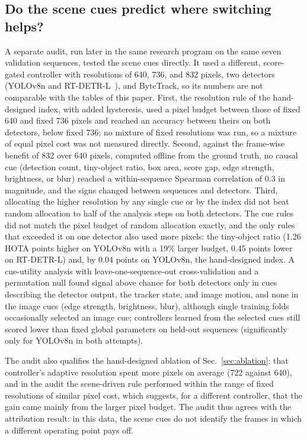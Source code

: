 \documentclass[journal]{new-aiaa}
\begin{document}
\subsection{Do the scene cues predict where switching helps?}
A separate audit, run later in the same research program on the same seven validation sequences, tested the scene cues directly. It used a different, score-gated controller with resolutions of 640, 736, and 832 pixels, two detectors (YOLOv8n and RT-DETR-L~\cite{zhao2024rtdetr}), and ByteTrack, so its numbers are not comparable with the tables of this paper. First, the resolution rule of the hand-designed index, with added hysteresis, used a pixel budget between those of fixed 640 and fixed 736 pixels and reached an accuracy between theirs on both detectors, below fixed 736; no mixture of fixed resolutions was run, so a mixture of equal pixel cost was not measured directly. Second, against the frame-wise benefit of 832 over 640 pixels, computed offline from the ground truth, no causal cue (detection count, tiny-object ratio, box area, score gap, edge strength, brightness, or blur) reached a within-sequence Spearman correlation of 0.3 in magnitude, and the signs changed between sequences and detectors. Third, allocating the higher resolution by any single cue or by the index did not beat random allocation to half of the analysis steps on both detectors. The cue rules did not match the pixel budget of random allocation exactly, and the only rules that exceeded it on one detector also used more pixels: the tiny-object ratio (1.26 HOTA points higher on YOLOv8n with a 19\% larger budget, 0.45 points lower on RT-DETR-L) and, by 0.04 points on YOLOv8n, the hand-designed index. A cue-utility analysis with leave-one-sequence-out cross-validation and a permutation null found signal above chance for both detectors only in cues describing the detector output, the tracker state, and image motion, and none in the image cues (edge strength, brightness, blur), although single training folds occasionally selected an image cue; controllers learned from the selected cues still scored lower than fixed global parameters on held-out sequences (significantly only for YOLOv8n in both attempts).

The audit also qualifies the hand-designed ablation of Sec.~\ref{sec:ablation}: that controller's adaptive resolution spent more pixels on average (722 against 640), and in the audit the scene-driven rule performed within the range of fixed resolutions of similar pixel cost, which suggests, for a different controller, that the gain came mainly from the larger pixel budget. The audit thus agrees with the attribution result: in this data, the scene cues do not identify the frames in which a different operating point pays off.
\end{document}
